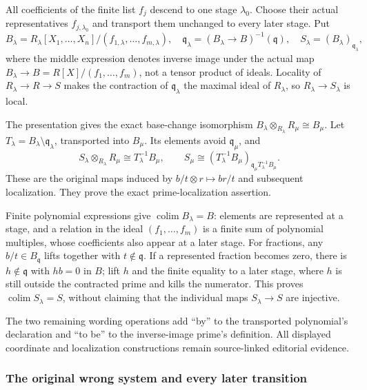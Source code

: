 All coefficients of the finite list \(f_j\) descend to one stage \(\lambda_0\). Choose their actual representatives \(f_{j,\lambda_0}\) and transport them unchanged to every later stage. Put \[
B_\lambda=R_\lambda[X_1,\ldots,X_n]/(f_{1,\lambda},\ldots,f_{m,\lambda}),
\quad
\mathfrak q_\lambda=(B_\lambda\to B)^{-1}(\mathfrak q),\quad
S_\lambda=(B_\lambda)_{\mathfrak q_\lambda},
\] where the middle expression denotes inverse image under the actual map \(B_\lambda\to B=R[X]/(f_1,\ldots,f_m)\), not a tensor product of ideals. Locality of \(R_\lambda\to R\to S\) makes the contraction of \(\mathfrak q_\lambda\) the maximal ideal of \(R_\lambda\), so \(R_\lambda\to S_\lambda\) is local.

The presentation gives the exact base-change isomorphism \(B_\lambda\otimes_{R_\lambda}R_\mu\cong B_\mu\). Let \(T_\lambda=B_\lambda\setminus\mathfrak q_\lambda\), transported into \(B_\mu\). Its elements avoid \(\mathfrak q_\mu\), and \[
S_\lambda\otimes_{R_\lambda}R_\mu
\cong T_\lambda^{-1}B_\mu,\qquad
S_\mu\cong(T_\lambda^{-1}B_\mu)_{\mathfrak q_\mu T_\lambda^{-1}B_\mu}.
\] These are the original maps induced by \(b/t\otimes r\mapsto br/t\) and subsequent localization. They prove the exact prime-localization assertion.

Finite polynomial expressions give \(\operatorname{colim}B_\lambda=B\): elements are represented at a stage, and a relation in the ideal \((f_1,\ldots,f_m)\) is a finite sum of polynomial multiples, whose coefficients also appear at a later stage. For fractions, any \(b/t\in B_{\mathfrak q}\) lifts together with \(t\notin\mathfrak q\). If a represented fraction becomes zero, there is \(h\notin\mathfrak q\) with \(hb=0\) in \(B\); lift \(h\) and the finite equality to a later stage, where \(h\) is still outside the contracted prime and kills the numerator. This proves \(\operatorname{colim}S_\lambda=S\), without claiming that the individual maps \(S_\lambda\to S\) are injective.

The two remaining wording operations add ``by'' to the transported polynomial's declaration and ``to be'' to the inverse-image prime's definition. All displayed coordinate and localization constructions remain source-linked editorial evidence.

\subsubsection{The original wrong system and every later transition}\label{the-original-wrong-system-and-every-later-transition}

